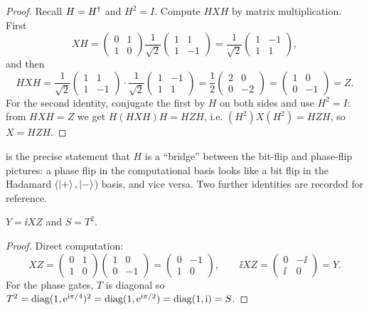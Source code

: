 \begin{proof}
Recall $H=H^{\dagger}$ and $H^{2}=I$. Compute $HXH$ by matrix multiplication. First
\[
  XH=\begin{pmatrix}0&1\\1&0\end{pmatrix}
     \frac{1}{\sqrt2}\begin{pmatrix}1&1\\1&-1\end{pmatrix}
    =\frac{1}{\sqrt2}\begin{pmatrix}1&-1\\1&1\end{pmatrix},
\]
and then
\[
  HXH=\frac{1}{\sqrt2}\begin{pmatrix}1&1\\1&-1\end{pmatrix}\cdot
      \frac{1}{\sqrt2}\begin{pmatrix}1&-1\\1&1\end{pmatrix}
     =\frac{1}{2}\begin{pmatrix}2&0\\0&-2\end{pmatrix}
     =\begin{pmatrix}1&0\\0&-1\end{pmatrix}=Z.
\]
For the second identity, conjugate the first by $H$ on both sides and use $H^{2}=I$:
from $HXH=Z$ we get $H(HXH)H=HZH$, i.e. $(H^{2})X(H^{2})=HZH$, so $X=HZH$.
\end{proof}

 is the precise statement that $H$ is a ``bridge'' between the
bit-flip and phase-flip pictures: a phase flip in the computational basis looks like
a bit flip in the Hadamard ($\ket{+},\ket{-}$) basis, and vice versa. Two further
identities are recorded for reference.

\begin{proposition}\label{prop:lec01-yxz}
$Y=\ii XZ$ and $S=T^{2}$.
\end{proposition}

\begin{proof}
Direct computation:
\[
  XZ=\begin{pmatrix}0&1\\1&0\end{pmatrix}
     \begin{pmatrix}1&0\\0&-1\end{pmatrix}
    =\begin{pmatrix}0&-1\\1&0\end{pmatrix},\qquad
  \ii XZ=\begin{pmatrix}0&-\ii\\\ii&0\end{pmatrix}=Y.
\]
For the phase gates, $T$ is diagonal so $T^{2}=\operatorname{diag}(1,\mathrm{e}^{\mathrm{i}\pi/4})^{2}=\operatorname{diag}(1,\mathrm{e}^{\mathrm{i}\pi/2})=\operatorname{diag}(1,\mathrm{i})=S$.
\end{proof}

